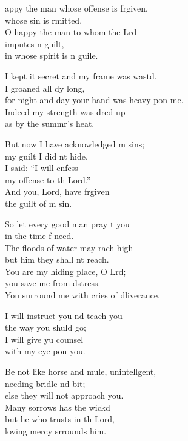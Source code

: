 \settowidth{\versewidth}{for night and day your hand was heavy upon me.}
\begin{psalmverse}%
  \begin{patverse}
appy the man whose offense is frgiven,\Med\\
whose sin is rmitted.\\
O happy the man to whom the Lrd\Flex\\
imputes n guilt,\Med\\
in whose spirit is n guile.

I kept it secret and my frame was wastd.\Flex\\
I groaned all dy long,\Med\\
for night and day your hand was heavy pon me.\\
Indeed my strength was dr\pointup{\i}ed up\Med\\
as by the summr’s heat.

But now I have acknowledged m sins;\Med\\
my guilt I did nt hide.\\
I said: “I will cnfess\Med\\
my offense to th Lord.”\\
And you, Lord, have frgiven\Med\\
the guilt of m sin.

So let every good man pray t you\Med\\
in the time f need.\\
The floods of water may rach high\Med\\
but him they shall nt reach.\\
You are my hiding place, O Lrd;\Flex\\
you save me from d\pointup{\i}stress.\Med\\
You surround me with cries of dliverance.

I will instruct you nd teach you\Med\\
the way you shuld go;\\
I will give yu counsel\Med\\
with my eye pon you.

Be not like horse and mule, unintell\pointup{\i}gent,\Flex\\
needing bridle nd bit;\Med\\
else they will not approach you.\Med\\
Many sorrows has the wickd\\
but he who trusts in th Lord,\Med\\
loving mercy srrounds him.


\end{patverse}
\end{psalmverse}
